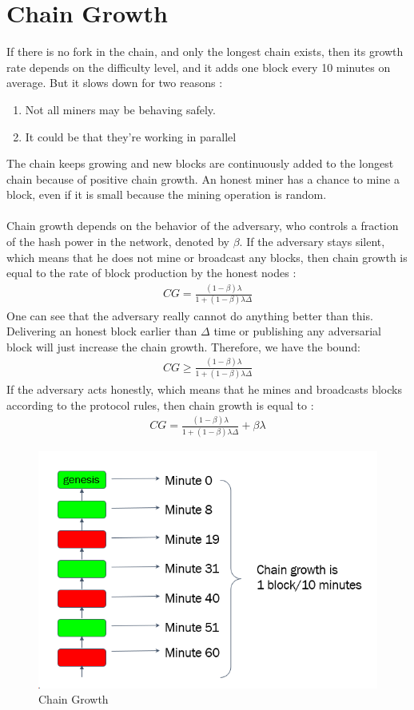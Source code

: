\section{Chain Growth}
If there is no fork in the chain, and only the longest chain exists, then its growth rate depends on the difficulty level, and it adds one block every 10 minutes on average.  But it slows down for two reasons :
\begin{enumerate}
    \item Not all miners may be behaving safely.
    \item It could be that they're working in parallel
\end{enumerate}
The chain keeps growing and new blocks are continuously added to the longest chain because of positive chain growth. An honest miner has a chance to mine a block, even if it is small because the mining operation is random.\\\\
Chain growth depends on the behavior of the adversary, who controls a fraction of the hash power in the network, denoted by $\beta$. If the adversary stays silent, which means that he does not mine or broadcast any blocks, then chain growth is equal to the rate of block production by the honest nodes :
\begin{align*}
    CG=\frac{(1-\beta)\lambda}{1+(1-\beta)\lambda\Delta}
\end{align*}
One can see that the adversary really cannot do anything better than this. Delivering an honest block earlier than $\Delta$ time or publishing any adversarial block will just increase the chain growth. Therefore, we have the bound:
\begin{align}
    CG\ge \frac{(1-\beta)\lambda}{1+(1-\beta)\lambda\Delta}
    \label{eq1}
\end{align}
 If the adversary acts honestly, which means that he mines and broadcasts blocks according to the protocol rules, then chain growth is equal to :
 \begin{align*}
    CG=\frac{(1-\beta)\lambda}{1+(1-\beta)\lambda\Delta} + \beta\lambda
 \end{align*}
\begin{figure}[h!]
    \centering
    \includegraphics[width=0.5\linewidth]{Fig/07/F1}
    \caption{Chain Growth}
    \label{fig:f1}
\end{figure}
